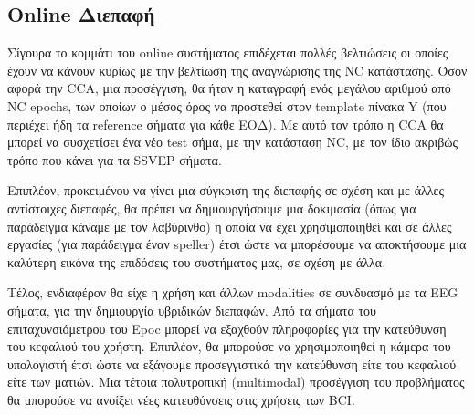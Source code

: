 \documentclass[11pt,a4paper,english,greek,twoside]{../Thesis}
\begin{document}
\subsection{Online Διεπαφή}
\par Σίγουρα το κομμάτι του online συστήματος επιδέχεται πολλές βελτιώσεις οι οποίες έχουν να κάνουν κυρίως με την βελτίωση της αναγνώρισης της NC κατάστασης. Όσον αφορά την CCA, μια προσέγγιση, θα ήταν η καταγραφή ενός μεγάλου αριθμού από NC epochs, των οποίων ο μέσος όρος να προστεθεί στον template πίνακα Y (που περιέχει ήδη τα reference σήματα για κάθε ΕΟΔ). Με αυτό τον τρόπο η CCA θα μπορεί να συσχετίσει ένα νέο test σήμα, με την κατάσταση NC, με τον ίδιο ακριβώς τρόπο που κάνει για τα SSVEP σήματα. 

\par Επιπλέον, προκειμένου να γίνει μια σύγκριση της διεπαφής σε σχέση και με άλλες αντίστοιχες διεπαφές, θα πρέπει να δημιουργήσουμε μια δοκιμασία (όπως για παράδειγμα κάναμε με τον λαβύρινθο) η οποία να έχει χρησιμοποιηθεί και σε άλλες εργασίες (για παράδειγμα έναν speller) έτσι ώστε να μπορέσουμε να αποκτήσουμε μια καλύτερη εικόνα της επιδόσεις του συστήματος μας, σε σχέση με άλλα. 

\par Τέλος, ενδιαφέρον θα είχε η χρήση και άλλων modalities σε συνδυασμό με τα EEG σήματα, για την δημιουργία υβριδικών διεπαφών. Από τα σήματα του επιταχυνσιόμετρου του Epoc μπορεί να εξαχθούν πληροφορίες για την κατεύθυνση του κεφαλιού του χρήστη. Επιπλέον, θα μπορούσε να χρησιμοποιηθεί η κάμερα του υπολογιστή έτσι ώστε να εξάγουμε προσεγγιστικά την κατεύθυνση είτε του κεφαλιού είτε των ματιών. Μια τέτοια πολυτροπική (multimodal) προσέγγιση του προβλήματος θα μπορούσε να ανοίξει νέες κατευθύνσεις στις χρήσεις των BCI.
\end{document}
